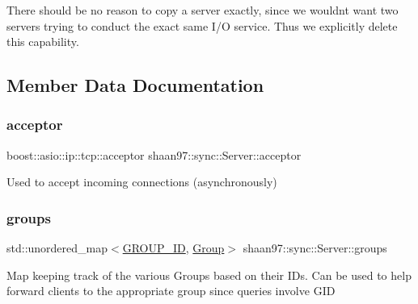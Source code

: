 There should be no reason to copy a server exactly, since we wouldn\textquotesingle{}t want two servers trying to conduct the exact same I/O service. Thus we explicitly delete this capability. 

\subsection{Member Data Documentation}
\mbox{\label{classshaan97_1_1sync_1_1_server_abcdfb6bb878a7996b144b15415640b8e}} 
\subsubsection{\texorpdfstring{acceptor}{acceptor}}
{\footnotesize\ttfamily boost\+::asio\+::ip\+::tcp\+::acceptor shaan97\+::sync\+::\+Server\+::acceptor\hspace{0.3cm}{\ttfamily [private]}}



Used to accept incoming connections (asynchronously) 

\mbox{\label{classshaan97_1_1sync_1_1_server_a9c7e24eecc094689890f9dd97df3dd50}} 
\subsubsection{\texorpdfstring{groups}{groups}}
{\footnotesize\ttfamily std\+::unordered\+\_\+map$<$\hyperlink{namespaceshaan97_1_1sync_a34cebf175d27dfc3d82f24608f7043c1}{G\+R\+O\+U\+P\+\_\+\+ID}, \hyperlink{classshaan97_1_1sync_1_1_group}{Group}$>$ shaan97\+::sync\+::\+Server\+::groups\hspace{0.3cm}{\ttfamily [private]}}

Map keeping track of the various Groups based on their ID\textquotesingle{}s. Can be used to help forward clients to the appropriate group since queries involve G\+ID \mbox{\label{classshaan97_1_1sync_1_1_server_a613155fba91990f1c9e2b0852a752110}} 
